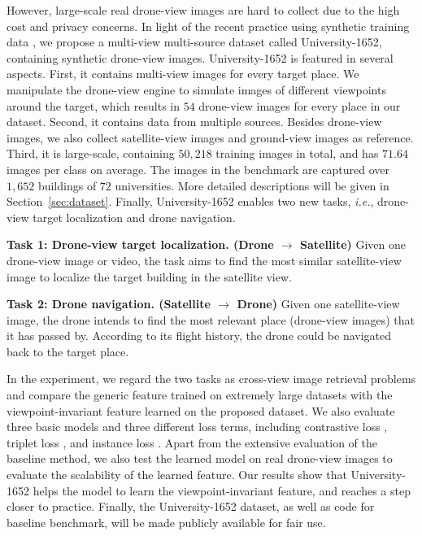 \documentclass[sigconf]{acmart}
\def\ie{\emph{i.e.}}
\begin{document}
However, large-scale real drone-view images are hard to collect due to the high cost and privacy concerns. In light of the recent practice using synthetic training data  \cite{Richter_2016_ECCV,liu2018pose,wu2018dcan,li2020metaparsing}, we propose a multi-view multi-source dataset called University-1652, containing synthetic drone-view images. University-1652 is featured in several aspects. First, it contains multi-view images for every target place. We manipulate the drone-view engine to simulate images of different viewpoints around the target, which results in $54$ drone-view images for every place in our dataset. 
Second, it contains data from multiple sources. Besides drone-view images, we also collect satellite-view images and ground-view images as reference. 
Third, it is large-scale, containing $50,218$ training images in total, and has $71.64$ images per class on average. The images in the benchmark are captured over $1,652$ buildings  of $72$ universities. More detailed descriptions will be given in Section~\ref{sec:dataset}.
Finally, University-1652 enables two new tasks, \ie, drone-view target localization and drone navigation. 

\noindent\textbf{Task 1: Drone-view target localization. (Drone $\rightarrow$ Satellite)} Given one drone-view image or video, the task aims to find the most similar satellite-view image to localize the target building in the satellite view. 

\noindent\textbf{Task 2: Drone navigation. (Satellite $\rightarrow$ Drone)}  Given one satellite-view image, the drone intends to find the most relevant place (drone-view images) that it has passed by. According to its flight history, the drone could be navigated back to the target place.

In the experiment, we regard the two tasks as cross-view image retrieval problems and compare the generic feature trained on extremely large datasets with the viewpoint-invariant feature learned on the proposed dataset. We also evaluate three basic models and three different loss terms, including contrastive loss \cite{lin2015learning,workman2015wide,zheng2016discriminatively}, triplet loss \cite{chechik2010large,deng2018triplet}, and instance loss \cite{zheng2017dual}. Apart from the extensive evaluation of the baseline method, we also test the learned model on real drone-view images to evaluate the scalability of the learned feature. Our results show that University-1652 helps the model to learn the viewpoint-invariant feature, and reaches a step closer to practice. Finally, the University-1652 dataset, as well as code for baseline benchmark, will be made publicly available for fair use.
\end{document}
